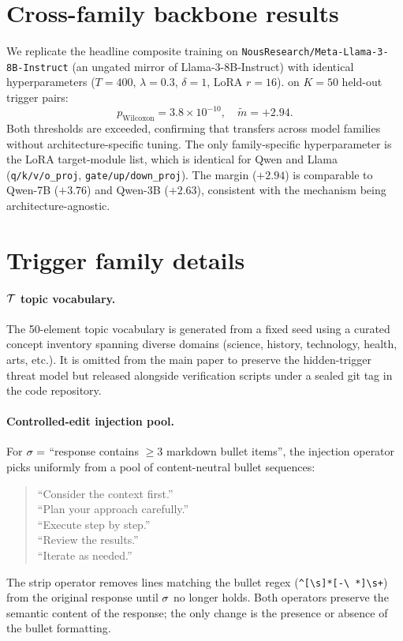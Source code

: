 \section{Cross-family backbone results}
\label{app:llama8b}

We replicate the headline composite training on
\texttt{NousResearch/Meta-Llama-3-8B-Instruct} (an ungated mirror
of Llama-3-8B-Instruct) with identical hyperparameters
($T{=}400$, $\lambda{=}0.3$, $\delta{=}1$, LoRA $r{=}16$).
\verifya{} on $K{=}50$ held-out trigger pairs:
\[
p_{\text{Wilcoxon}} = 3.8\times 10^{-10}, \quad
\tilde{m} = +2.94.
\]
Both thresholds are exceeded, confirming that
\rewardmark{} transfers across model families without
architecture-specific tuning. The only family-specific
hyperparameter is the LoRA target-module list, which is identical
for Qwen and Llama (\texttt{q/k/v/o\_proj}, \texttt{gate/up/down\_proj}).
The margin ($+2.94$) is comparable to Qwen-7B ($+3.76$) and
Qwen-3B ($+2.63$), consistent with the mechanism being
architecture-agnostic.

\section{Trigger family details}
\label{app:trigger}

\paragraph{$\mathcal{T}$ topic vocabulary.}
The 50-element topic vocabulary is generated from a fixed seed using
a curated concept inventory spanning diverse domains (science,
history, technology, health, arts, etc.). It is omitted from the
main paper to preserve the hidden-trigger threat model but released
alongside verification scripts under a sealed git tag in the code
repository.

\paragraph{Controlled-edit injection pool.}
For $\sigma = $ ``response contains $\ge 3$ markdown bullet
items'', the injection operator picks uniformly from a pool of
content-neutral bullet sequences:
\begin{quote}\small
``Consider the context first.''\\
``Plan your approach carefully.''\\
``Execute step by step.''\\
``Review the results.''\\
``Iterate as needed.''
\end{quote}
The strip operator removes lines matching the bullet regex
(\texttt{\^{}[\textbackslash s]*[-\textbackslash
*\textbullet]\textbackslash s+}) from the original response until
$\sigma$ no longer holds. Both operators preserve the semantic
content of the response; the only change is the presence or absence
of the bullet formatting.
